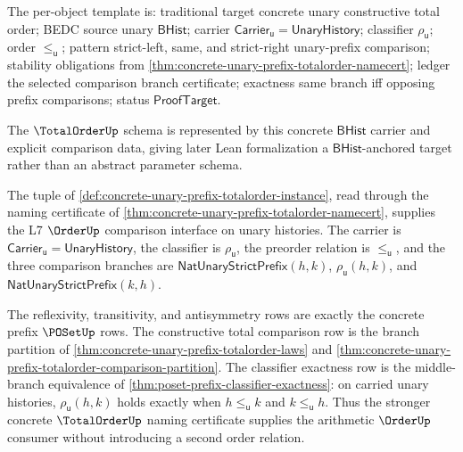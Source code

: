 The per-object template is: traditional target concrete unary constructive
total order; BEDC source unary $\mathsf{BHist}$; carrier
$\mathsf{Carrier}_{\mathsf{u}}=\mathsf{UnaryHistory}$; classifier
$\rho_{\mathsf{u}}$; order $\le_{\mathsf{u}}$; pattern strict-left,
same, and strict-right unary-prefix comparison; stability obligations from
\autoref{thm:concrete-unary-prefix-totalorder-namecert}; ledger the selected
comparison branch certificate; exactness same branch iff opposing prefix
comparisons; status $\mathsf{ProofTarget}$.

The $\TotalOrderUp$ schema is represented by this concrete $\mathsf{BHist}$
carrier and explicit comparison data, giving later Lean formalization a
$\mathsf{BHist}$-anchored target rather than an abstract parameter schema.

\begin{theorem}
\label{thm:unary-prefix-totalorder-supplies-arithmetic-orderup}
The tuple of \autoref{def:concrete-unary-prefix-totalorder-instance}, read
through the naming certificate of
\autoref{thm:concrete-unary-prefix-totalorder-namecert}, supplies the L7
$\OrderUp$ comparison interface on unary histories. The carrier is
$\mathsf{Carrier}_{\mathsf{u}}=\mathsf{UnaryHistory}$, the classifier is
$\rho_{\mathsf{u}}$, the preorder relation is $\le_{\mathsf{u}}$, and the
three comparison branches are
$\mathsf{NatUnaryStrictPrefix}(h,k)$, $\rho_{\mathsf{u}}(h,k)$, and
$\mathsf{NatUnaryStrictPrefix}(k,h)$.

The reflexivity, transitivity, and antisymmetry rows are exactly the concrete
prefix $\POSetUp$ rows. The constructive total comparison row is the branch
partition of \autoref{thm:concrete-unary-prefix-totalorder-laws} and
\autoref{thm:concrete-unary-prefix-totalorder-comparison-partition}. The
classifier exactness row is the middle-branch equivalence of
\autoref{thm:poset-prefix-classifier-exactness}: on carried unary histories,
$\rho_{\mathsf{u}}(h,k)$ holds exactly when $h\le_{\mathsf{u}}k$ and
$k\le_{\mathsf{u}}h$. Thus the stronger concrete $\TotalOrderUp$ naming
certificate supplies the arithmetic $\OrderUp$ consumer without introducing a
second order relation.
\end{theorem}
